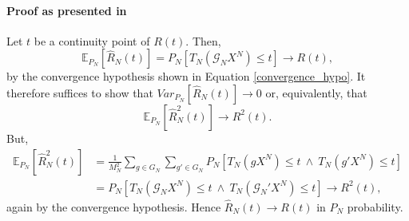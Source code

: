 \documentclass[12pt, a4paper]{article}
\theoremstyle{MAstyle} \newtheorem{assumption}{Assumption}[section]
\theoremstyle{MAstyle} \newtheorem{definition}{Definition}[section]
\theoremstyle{MAstyle} \newtheorem{theorem}{Theorem}[section]
\begin{document}
			\paragraph{Proof as presented in \cite{lehmann_testing_2005}\\}
			Let $t$ be a continuity point of $R(t)$. Then, 
			\begin{equation}
				\mathbb{E}_{P_N}\left[\hat{R}_N(t)\right] = P_N\left[T_N(\mathcal{G}_NX^N) \leq t\right] \rightarrow R(t),
			\end{equation}
			by the convergence hypothesis shown in Equation \ref{convergence_hypo}. It therefore suffices to show that $\textit{Var}_{P_N}\left[\hat{R}_N(t)\right] \rightarrow 0$ or, equivalently, that
			\begin{equation}
				\mathbb{E}_{P_N}\left[\hat{R}_N^2(t)\right] \rightarrow R^2(t).
			\end{equation}
			But, 
			\begin{equation}
				\begin{split}
					\mathbb{E}_{P_N}\left[\hat{R}_N^2(t)\right] &= \frac{1}{M_N^2}\sum_{g \in G_N}\sum_{g' \in G_N} P_N\left[T_N(gX^N) \leq t \ \land \ T_N(g'X^N) \leq t\right] \\
					&= P_N\left[T_N(\mathcal{G}_NX^N) \leq t \ \land \ T_N(\mathcal{G}_N'X^N) \leq t\right] \rightarrow R^2(t),
				\end{split}
			\end{equation}
			again by the convergence hypothesis. Hence $\hat{R}_N(t) \rightarrow R(t)$ in $P_N$ probability.
			
\end{document}
